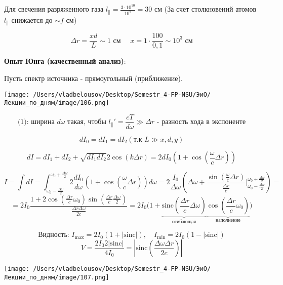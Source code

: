 \documentclass[12pt, a4paper]{report}
\begin{document}
Для свечения разряженного газа \( \displaystyle  l_{\parallel } = \frac{3 \cdot 10^{ 10 }  }{10^{9 } } = 30 \text{ см}    \) (За счет столкновений атомов \( l_{\parallel}  \) снижается до \( \sim f \text{ см}  \))

\[ \Delta r= \frac{x d }{ L } \sim 1 \text{ см }  \quad  x  = 1 \cdot \frac{ 100}{ 0,1 }  \sim 10^{3 }  \text{ см}  \] 

\textbf{Опыт Юнга (качественный анализ)}: 

Пусть спектр источника - прямоугольный (приближение). 

\begin{center}
    \texttt{[image: /Users/vladbelousov/Desktop/Semestr\_4-FP-NSU/ЭиО/Лекции\_по\_дням/image/106.png]}
\end{center}  
\[ \text{(1): ширина } d \omega \text{ такая, чтобы } l_{\parallel } ' = \frac{cT }{d \omega } \gg \Delta r \text{ - разность хода в экспоненте}     \] 

\[ d I_0 = d I_1 = d I_2 ( \text{т.к } L \gg x,d,y  ) \] 

\[ dI = d I_1 + d I_2 + \sqrt{d I_1 d I_2 } 2 \cos (k \Delta r ) = 2 d I_0 \left( 1 + \cos \left( \frac{\omega}{c }  \Delta r \right) \right) \] 

\[ I = \int d I = \int_{\omega_0- \frac{\Delta \omega }{2 } }^{\omega_0+ \frac{\Delta \omega }{2 }  } 2 \frac{d I_0 }{d \omega } \left( 1 + \cos \left( \frac{ \omega }{c } \Delta r   \right) \right) d \omega = 2 \frac{ I_0 }{\Delta \omega } \left( \Delta \omega + \frac{ \sin \left( \frac{\omega}{c }  \Delta r \right)}{\frac{\Delta r}{c} } \bigg | ^{\omega_0 + \frac{\Delta \omega }{2 }  }_{\omega_0 - \frac{\Delta \omega }{2} }   \right) = \] 
\[= 2 I_0 \frac{ 1  + 2 \cos \left( \frac{\Delta r}{c} \omega_0  \right) \sin \left( \frac{\Delta r}{c } \frac{\Delta \omega }{2 }   \right) }{\frac{ \Delta r \Delta \omega}{ 2 c } }  = 2 I_0 \bigg( 1 + \underbrace{\mathrm{sinc }  \left( \frac{\Delta r }{c } \Delta \omega   \right)}_{\text{огибающая} } \underbrace{\cos \left( \frac{\Delta r }{c } \omega_0  \right)}_{\text{наполнение} }  \bigg)\] 

\[  \text{Видность: } I_{\max  } = 2 I_0 (1 + |\mathrm{sinc }   |) , \quad  I_{ \min  } = 2 I_0 (1 - |\mathrm{sinc}  |) \]
\[ V = \frac{2 I_0 2 |\mathrm{sinc}  |}{4 I_0 } = \left\lvert \mathrm{sinc }  \left( \frac{\Delta \omega \Delta r }{2 c }  \right)  \right\rvert  \]  

\begin{center}
    \texttt{[image: /Users/vladbelousov/Desktop/Semestr\_4-FP-NSU/ЭиО/Лекции\_по\_дням/image/107.png]}
\end{center}  
\end{document}
